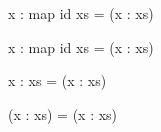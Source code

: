 \documentclass{beamer}
\begin{document}
\begin{frame}[t,fragile]
\begin{center}
\begin{overprint}
\begin{semiverbatim}
\alert{x}    : map id xs   = (x : xs)
\end{semiverbatim}

\begin{semiverbatim}
x    : \alert{map id xs}   = (x : xs)
\end{semiverbatim}

\begin{semiverbatim}
x    : \alert{xs}          = (x : xs)
\end{semiverbatim}

\begin{semiverbatim}
\alert<26>{(x    : xs)}        = \alert<26>{(x : xs)}
\end{semiverbatim}

\end{overprint}
\end{center}

\end{frame}
\end{document}
